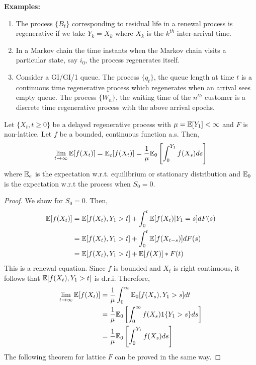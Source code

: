 \documentclass[all-lectures.tex]{subfiles}
\begin{document}
\indent \textbf{Examples:} 
\begin{enumerate}
\item The process $\{B_t\}$ corresponding to residual life in a renewal process is regenerative if we take $Y_k = X_k$ where $X_k$ is the $k^{th}$ inter-arrival time.
\item In a Markov chain the time instants when the Markov chain visits a particular state, say $i_0$, the process regenerates itself. 
\item Consider a GI/GI/1 queue. The process $\{q_t\}$, the queue length at time $t$ is a continuous time regenerative process which regenerates when an arrival sees empty queue. The process $\{W_n\}$, the waiting time of the $n^{th}$ customer is a discrete time regenerative process with the above arrival epochs. 
\end{enumerate} 
\begin{thm}
Let $\{X_t,t\geq 0\}$ be a delayed regenerative process with $\mu = \mathbb{E}[Y_1] < \infty$ and $F$ is non-lattice. Let $f$ be a bounded,  continuous function a.s. Then,
\begin{align*}
\lim_{t\to \infty} \mathbb{E}[f(X_t)] = \mathbb{E}_e[f(X_t)] = \frac{1}{\mu} \mathbb{E}_0\left[ \int_0^{Y_1} f(X_s) ds\right]
\end{align*}
where $\mathbb{E}_e$ is the expectation w.r.t. equilibrium or stationary distribution and $\mathbb{E}_0$ is the expectation w.r.t the process when $S_0 = 0$.
\begin{proof} We show for $S_0 = 0$. Then, 
\begin{align*}
\mathbb{E}[f(X_t)] &= \mathbb{E}[f(X_t), Y_1 > t] + \int_0^t \mathbb{E}[f(X_t)| Y_1 = s] dF(s) \\
&= \mathbb{E}[f(X_t), Y_1 > t] + \int_0^t \mathbb{E}[f(X_{t-s})] dF(s)\\
&= \mathbb{E}[f(X_t), Y_1 > t] + \mathbb{E}[f(X)]*F(t)
\end{align*}
This is a renewal equation. Since $f$ is bounded and $X_t$ is right continuous, it follows that $\mathbb{E}[f(X_t), Y_1 > t]$ is d.r.i. Therefore,
\begin{align*}
\lim_{t\to \infty} \mathbb{E}[f(X_t)] &= \frac{1}{\mu} \int_0^\infty \mathbb{E}_0[f(X_s), Y_1 >  s] dt\\
&= \frac{1}{\mu} \mathbb{E}_0\left[ \int_0^\infty f(X_s)1\{ Y_1 >  s\} ds\right]\\
&= \frac{1}{\mu} \mathbb{E}_0\left[ \int_0^{Y_1} f(X_s) ds\right] \qedhere
\end{align*}
The following theorem for lattice $F$ can be proved in the same way.
\newpage
\end{proof}
\end{thm}
\end{document}
